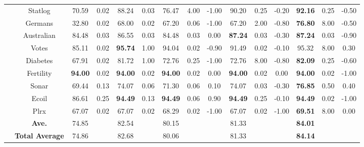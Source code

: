 \documentclass[journal,12pn, onecolumn]{IEEEtran}
\begin{document}
{{{\begin{table}
{{\begin{tabular}{ccccccccccccccc}
    \multicolumn{1}{c}{} & \multicolumn{1}{c}{Statlog} & 70.59  & 0.02  & 88.24  & 0.03  & 76.47  & 4.00  & -1.00  & 90.20  & 0.25  & -0.20  & \textbf{92.16 } & 0.25  & -0.50  \\
    \multicolumn{1}{c}{} & \multicolumn{1}{c}{Germans} & 32.80  & 0.02  & 68.00  & 0.02  & 67.20  & 0.06  & -1.00  & 67.20  & 2.00  & -0.80  & \textbf{76.80 } & 8.00  & -0.50  \\
    \multicolumn{1}{c}{} & \multicolumn{1}{c}{Australian} & 84.48  & 0.03  & 86.55  & 0.03  & 84.48  & 0.03  & 0.00  & \textbf{87.24 } & 0.03  & -0.30  & \textbf{87.24 } & 0.03  & -0.90  \\
    \multicolumn{1}{c}{} & \multicolumn{1}{c}{Votes} & 85.11  & 0.02  & \textbf{95.74 } & 1.00  & 94.04  & 0.02  & -0.90  & 91.49  & 0.02  & -0.10  & 95.32  & 8.00  & 0.30  \\
    \multicolumn{1}{c}{} & \multicolumn{1}{c}{Diabetes} & 67.91  & 0.02  & 81.72  & 1.00  & 72.76  & 0.25  & -1.00  & 72.76  & 8.00  & -0.80  & \textbf{82.09 } & 0.25  & -0.60  \\
    \multicolumn{1}{c}{} & \multicolumn{1}{c}{Fertility} & \textbf{94.00 } & 0.02  & \textbf{94.00 } & 0.02  & \textbf{94.00 } & 0.02  & 0.00  & \textbf{94.00 } & 0.02  & 0.00  & \textbf{94.00 } & 0.02  & -1.00  \\
    \multicolumn{1}{c}{} & \multicolumn{1}{c}{Sonar} & 69.44  & 0.13  & 74.07  & 0.06  & 71.30  & 0.06  & 0.10  & 74.07  & 0.03  & -0.30  & \textbf{76.85 } & 0.50  & 0.40  \\
    \multicolumn{1}{c}{} & \multicolumn{1}{c}{Ecoil} & 86.61  & 0.25  & \textbf{94.49 } & 0.13  & \textbf{94.49 } & 0.06  & 0.90  & \textbf{94.49 } & 0.25  & -0.10  & \textbf{94.49 } & 0.02  & -1.00  \\
    \multicolumn{1}{c}{} & \multicolumn{1}{c}{Plrx} & 67.07  & 0.02  & 67.07  & 0.02  & 68.29  & 0.02  & -1.00  & 67.07  & 0.02  & -1.00  & \textbf{69.51 } & 8.00  & 0.00  \\
\cmidrule{2-15}    \multicolumn{1}{c}{} & \multicolumn{1}{c}{\textbf{Ave. }} & 74.85  &       & 82.54  &       & 80.15  &       &       & 81.33  &       &       & \textbf{84.01 } &       &  \\
    \midrule
          & \textbf{Total Average} & 74.86 &       & 82.68 &       & 80.06 &       &       & 81.33 &       &       & \textbf{84.14} &       &  \\
    \bottomrule
    \end{tabular}}}
    \label{uci2}
\end{table}


}}}
\end{document}
